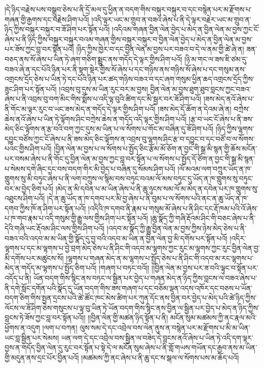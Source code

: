 །དེ་ཉིད་བརྗེས་པས་བསྒྲུབ་ཅེས་པ་ནི་དྲོ་མལ་དུ་ཕྱིན་ན་བདག་གིས་བསྐུར་བསྐུར་བ་དང་བསྙེན་པར་མ་རྫོགས་པ་གཞན་གྱི་རྒྱགས་དང་བརྗེས་ཤིག་པའོ། །འདི་ལྟར་ཡང་མ་གྲུབ་ན་བཟའ་ཞེས་པ་ནི་དེ་ལྟར་བརྗེར་ཡང་མ་གྲུབ་ན་ཉིད་ཀྱིས་བསྐུར་བསྐུར་བ་ཟོ་ཤིག་པར་སྟོན་པའོ། །འདིའམ་གཞན་བྱིན་ལེན་བྱེད་པ་མེད་ན་བྱིན་ལེན་མ་བྱས་ཀྱང་ངོ་ཞེས་པ་ནི་ཉིད་ཀྱིས་བསྐུར་བསྐུར་བའམ་གཞན་གྱིས་བསྐུར་བསྐུར་བ་བྱིན་ལེན་བྱེད་པ་མེད་ན་བྱིན་ལེན་མ་བྱས་པར་ཟོས་ཀྱང་བླ་བར་སྟོན་པའོ། །ཉིད་ཀྱིས་ཁྱེར་བ་དང་བྱིན་ལེན་མ་བྱས་པར་བཟའ་བ་དེ་ལ་ནམ་གྱི་ཚེ་ཞེ་ན། ཟན་བཅད་ནས་སོ་ཞེས་པ་ཡིན་ཏེ་ཞག་གཅིག་སྨྱུང་ནས་གདོད་དེ་ལྟར་གྱིས་ཤིག་པའོ། །ཉི་མ་གང་ལ་ཟས་ཇི་ཙམ་དུ་བཟའ་ཞེ་ན་དང་པོའི་ཉིན་པར་ནི་སྟག་སྡེར་གྱིས་སོ་ཞེས་པ་དང་གཉིས་ནས་གཉིས་སོ་ཞེས་པ་དང་གསུམ་ནས་འགྲངས་དྲོད་ཅེས་པ་ཡིན་ཏེ་དང་པོའི་ཉིན་པར་ཚད་གཉིས་བཟའ་བ་དང་ཞག་གསུམ་ཕྱིན་ཆད་འགྲངས་དྲོད་ཀྱིས་ཟུང་ཤིག་པར་སྟོན་པའོ། །འབྲས་བུ་དུས་མ་ཡིན་རུང་བར་མ་བྱས། བྱིན་ལེན་མ་བྱས་ཐུག་ཐུབ་བླངས་ཀྱང་བཟའ་ཞེས་པ་ནི་འབྲས་བུ་བག་མིང་གིས་སྨོས་པ་འདི་ལྟ་བུའི་ཚིག་དང་མི་སྦྱར་བར་ཟོ་ཤིག་པའོ། །ཟས་མེད་ནའོ་ཞེས་པ་ནི་གོང་མ་ལྟར་རུང་བ་ཡང་ཟས་མེད་ན་གདོད་དེ་ལྟར་གྱིས་ཤིག་པའོ། །ཟས་མེད་དོ་ཆོག་ན་དེའམ་ཞེ་ན། བཀྲེས་ཆེས་ནའོ་ཞེས་པ་ཡིན་ཏེ་ལྟོགས་ཤིང་བཀྲེས་ཆེས་ན་གདོད་འདི་ལྟར་གྱིས་ཤིག་པའོ། །རྩ་བ་ཡང་ངོ་ཞེས་པ་ནི་ཟས་མེད་ཅིང་ལྟོགས་ན་རྩ་བའི་བག་ཀྱང་དུས་མ་ཡིན་པ་ལ་སོགས་པ་གོང་མ་བཞིན་དུ་ཟོ་ཤིག་པའོ། །ཉིད་ཀྱིས་ལྷགས་དབྱུང་བཙོས་ཀྱང་ངོ་ཞེས་པ་ནི་ཟས་མེད་ཅིང་ལྟོགས་ན་འབྲས་བུ་ལྷགས་ཤིང་རྩ་བ་དབྱུང་བ་དང་བཙོ་བ་ལ་སོགས་པའང་གྱིས་ཤིག་པའོ། །བྱིན་ལེན་མ་བྱས་པ་ལ་སོགས་པ་སྤྱོད་ཅིང་རྩོམ་མོ་ཅོག་ན་བྱང་གི་སྒྲ་མི་སྙན་གྱི་ཆོས་མངོན་པར་བསམ་ཞེས་པ་ནི་གོང་དུ་བྱིན་ལེན་མ་བྱས་ཀྱང་བླ་བར་སྟོན་པ་ལ་སོགས་པ་སྤྱོད་དོ་ཙོག་ན་བྱང་གི་སྒྲ་མི་སྙན་པ་སེམས་དགེ་ཞིང་དྲང་བས་བདག་གིར་མི་བྱེད་པ་བཞིན་དུ་སོམས་ཤིག་པའོ། །ལོ་མའམ་ལག་བཀྲུར་ཡོད་ན་ཁ་གླུགས་སུ་མི་བཏུང་ཞེས་པ་ནི་ལག་བཀྲུས་ལ་སྙིམ་བས་བཏུང་བའམ་ལོ་མས་བཏུང་དུ་ཡོད་ན་ཁ་གླུགས་སུ་བཏུང་བར་མ་བྱེད་ཅིག་པའོ། །མེད་ན་མི་དབེན་པ་མ་ཡིན་ཞེས་པ་ནི་ཆུ་ཉུངས་སམ་ལོ་མ་མེད་ན་དབེན་པར་ཁ་གླུགས་སུ་འཐུངས་ཤིག་པའོ། །དེ་ན་ཆུ་ཡོད་ན་ཁ་དགབ་པར་མི་བྱ་ཞེས་པ་ནི་བུམ་པ་ལ་སོགས་པའི་ནང་ན་ཆུ་ཡོད་ན་ཁ་དགབ་ཀྱིས་ཁོ་ན་ཤིག་པར་སྟོན་པའོ། །འདིའི་ཁ་དགབ་ནི་རྣམ་པ་གསུམ་མོ་ཞེས་པ་ནི་ཤིང་དང་རྡོ་ཁམ་པའི་འོ་ཞེས་པ་ཁ་གབ་རྣམ་པ་འདི་གསུམ་གྱི་རྒྱུ་ལས་གྱིས་ཤིག་པར་སྟོན་པའོ། །ཆུ་སྣོད་ཀྱི་གཞི་རྡོའམ་ཤིང་གི་བཅང་ཞེས་པ་ནི་དེའི་གཞི་ཡང་རྡོའམ་ཤིང་ལས་གྱིས་ཤིག་པའོ། །འདབ་མ་སྣོད་ཀྱི་རྒྱུ་བྱིན་ལེན་མ་བྱས་ཀྱིས་ཉེས་མེད་ཅེས་པ་ནི་བཟའ་བའི་འདབ་མ་མ་ཡིན་གྱི་སྣོད་དུ་བྱ་བའི་འདབ་མ་ཡིན་ན་བྱིན་ལེན་བྱ་མི་དགོས་པར་སྟོན་པའོ། །འདིར་ལྷགས་པ་དང་མ་ལྷགས་པ་བྱེ་བྲག་མེད་ཅེས་པ་ནི་ཤིང་གི་འདབ་མ་ལྷགས་ཀྱང་རུང་མ་ལྷགས་ཀྱང་རུང་བྱིན་ལེན་བྱ་མི་དགོས་པར་མཚུངས་སོ། །ལྷགས་པ་གཞན་མེད་ན་མ་ལྷགས་པ་སྤྱོད་ཅེས་པ་ནི་ཤིང་གི་འདབ་མ་རང་ལྷགས་པ་མེད་ན་གདོད་མ་ལྷགས་པ་སྤྱོད་ཅིག་པའོ། །གཞག་པ་བཏང་བའོ།། །།བྱིན་ལེན་མ་བྱས་པར་ཟ་བའི་ལྟུང་བ་སྟོན་པར་འདོད་པ་ནི། ཡོན་བདག་གིས་སྙིང་ནས་བཏང་ལ་སྦྱིན་པར་བྱེད་པ་གཞན་མེད་ན་ཉིད་ཀྱིས་བླངས་ལ་བཟའ་ཞེས་པ་ནི་དགེ་སློང་དགོན་པའི་སྣོད་དུ་ཡོན་བདག་གིས་ཟས་གཞག་པ་དང་བཅོམ་ལྡན་འདས་འཁོར་དང་བཅས་པ་ཡོན་བདག་ཅིག་གིས་སྤྱན་དྲངས་པའི་ཚེ་ཚོང་ཁང་མེས་ཚིག་པར་ཀུན་དོང་ནས་བྱིན་བར་བྱེད་པ་མེད་པའི་ཚེ་ཉིད་ཀྱིས་ལོངས་ལ་ཟོ་ཤིག་ཅེས་གསུངས་པ་ལྟ་བུ་ཡིན་ཏེ་ཡོན་བདག་གིས་སྙིང་ནས་བྱིན་ལ་སྦྱིན་པར་བྱེད་པ་མེད་ན་ཉིད་ཀྱིས་བླངས་ཏེ་ཟོས་ཀྱང་བླ་བར་སྟོན་པའོ།། །།བྱིན་ལེན་གྱི་མཚན་ཉིད་སྟོན་པ་ནི། མངོན་སུམ་མཚམས་ཀྱི་ནང་རྣལ་མའི་ཕྱོགས་ན་འདུག །ལག་པ་བཀན། ལུས་སམ་དེ་དང་འབྲེལ་བས་ལེན་ནུས་ན་བསྙེན་པར་མ་རྫོགས་པ་མི་མ་ཡིན་ཡང་བླ་སྦྱིན་པར་སེམས། ཡན་ལག་དེ་དང་འབྲེལ་བས་སྦྱིན་ལ་བཟེད་དེ་བླངས་ནའོ་ཞེས་པ་ཡིན་ཏེ་འདི་དག་ལྟར་བྱས་ན་གདོད་བྱིན་ལེན་དུ་རུང་བར་སྟོན་པ་སྟེ་དེ་ལ་མངོན་སུམ་ཞེས་པ་ནི་གློ་གཡས་གཡོན་དང་རྒྱབ་ནས་མ་ཡིན་གྱི་མདུན་ནས་དྲང་པོར་བྱིན་པའོ། །མཚམས་ཀྱི་ནང་ཞེས་པ་ནི་ཆུ་དང་ས་སྒལ་ལ་སོགས་པས་མ་ཆོད་པའོ། 